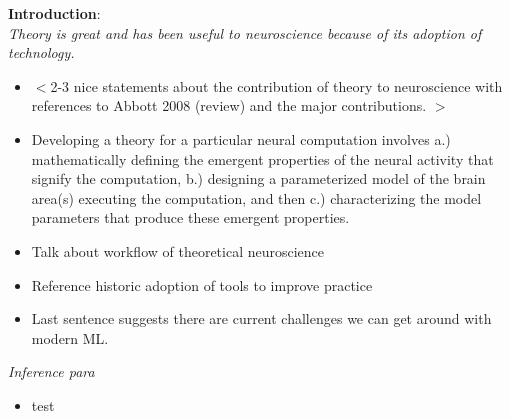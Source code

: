 \documentclass[11pt]{article}
\begin{document}
\textbf{Introduction}: \\
\textit{Theory is great and has been useful to neuroscience because of its adoption of technology.}
\begin{itemize} 
\item $<$2-3 nice statements about the contribution of theory to neuroscience with references to Abbott 2008 (review) and the major contributions. $>$ 
\item Developing a theory for a particular neural computation involves a.) mathematically defining the emergent properties of the neural activity that signify the computation, b.) designing a parameterized model of the brain area(s) executing the computation, and then c.) characterizing the model parameters that produce these emergent properties. 
\item Talk about workflow of theoretical neuroscience
\item Reference historic adoption of tools to improve practice
\item Last sentence suggests there are current challenges we can get around with modern ML.
\end{itemize}

\textit{Inference para}
\begin{itemize} 
\item test
\end{itemize}





\end{document}

